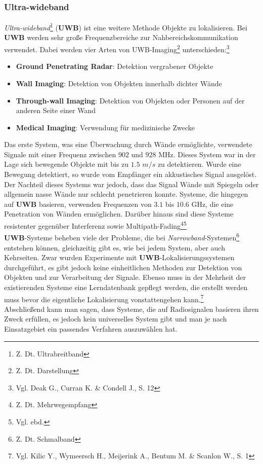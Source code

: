 \subsubsection{Ultra-wideband}

\textit{Ultra-wideband}\footnote{Z. Dt. Ultrabreitband} (\textbf{UWB}) ist eine weitere Methode Objekte zu lokalisieren. Bei \textbf{UWB} werden sehr große Frequenzbereiche zur Nahbereichskommunikation verwendet. Dabei werden vier Arten von UWB-Imaging\footnote{Z. Dt. Darstellung} unterschieden:\footnote{Vgl. Deak G.,  Curran K. \& Condell J., S. 12}
\begin{itemize}
 	\item \textbf{Ground Penetrating Radar}: Detektion vergrabener Objekte 
 	\item \textbf{Wall Imaging}: Detektion von Objekten innerhalb dichter Wände
 	\item \textbf{Through-wall Imaging}: Detektion von Objekten oder Personen auf der anderen Seite einer Wand
 	\item \textbf{Medical Imaging}: Verwendung für medizinische Zwecke
 \end{itemize} 

Das erste System, was eine Überwachung durch Wände ermöglichte, verwendete Signale mit einer Frequenz zwischen $902$ und $928$ MHz. Dieses System war in der Lage sich bewegende Objekte mit bis zu $1.5$ $m/s$ zu detektieren. Wurde eine Bewegung detektiert, so wurde vom Empfänger ein akkustisches Signal ausgelöst. Der Nachteil dieses Systems war jedoch, dass das Signal Wände mit Spiegeln oder allgemein nasse Wände nur schlecht penetrieren konnte. Systeme, die hingegen auf \textbf{UWB} basieren, verwenden Frequenzen von $3.1$ bis $10.6$ GHz, die eine Penetration von Wänden ermöglichen. Darüber hinaus sind diese Systeme resistenter gegenüber Interferenz sowie Multipath-Fading\footnote{Z. Dt. Mehrwegempfang}\footnote{Vgl. ebd.} \\
\textbf{UWB}-Systeme beheben viele der Probleme, die bei \textit{Narrowband}-Systemen\footnote{Z. Dt. Schmalband} entstehen können, gleichzeitig gibt es, wie bei jedem System, aber auch Kehrseiten. Zwar wurden Experimente mit \textbf{UWB}-Lokalisierungssystemen durchgeführt, es gibt jedoch keine einheitlichen Methoden zur Detektion von Objekten und zur Verarbeitung der Signale. Ebenso muss in der Mehrheit der existierenden Systeme eine Lerndatenbank gepflegt werden, die erstellt werden muss bevor die eigentliche Lokalisierung vonstattengehen kann.\footnote{Vgl. Kilic Y., Wymeersch H., Meijerink A., Bentum M. \& Scanlon W., S. 1}\\
Abschließend kann man sagen, dass Systeme, die auf Radiosignalen basieren ihren Zweck erfüllen, es jedoch kein universelles System gibt und man je nach Einsatzgebiet ein passendes Verfahren auszuwählen hat.


